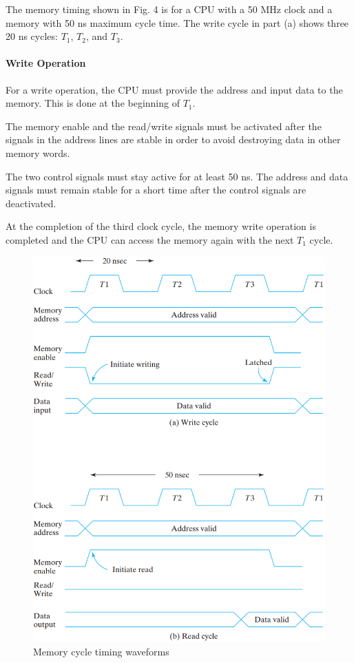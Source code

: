 The memory timing shown in Fig. 4 is for a CPU with a 50 MHz clock and a memory with 50 ns maximum cycle time. The write cycle in part (a) shows three 20 ns cycles: $T_1$, $T_2$, and $T_3$. 

\paragraph{Write Operation}

For a write operation, the CPU must provide the address and input data to the memory. This is done at the beginning of $T_1$.

The memory enable and the read/write signals must be activated after the signals in the address lines are stable in order to avoid destroying data in other memory words.

The two control signals must stay active for at least 50 ns. The address and data signals must remain stable for a short time after the control signals are deactivated.

At the completion of the third clock cycle, the memory write operation is completed and the CPU can access the memory again with the next $T_1$ cycle.

\begin{figure}[H]
  \centering
  \includegraphics[width=\linewidth]{img/fig-7.4.png}
  \caption{Memory cycle timing waveforms}
  \label{fig:7.4}
\end{figure}

